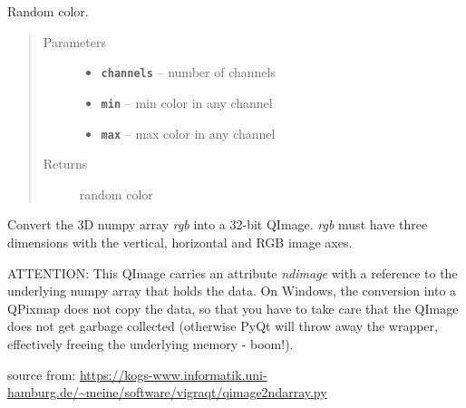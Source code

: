 \documentclass[letterpaper,10pt,english]{sphinxmanual}
\begin{document}

\begin{fulllineitems}
\label{RRtoolbox.lib:RRtoolbox.lib.image.random_color}
Random color.
\begin{quote}\begin{description}
\item[{Parameters}] \leavevmode\begin{itemize}
\item {} 
\textbf{\texttt{channels}} -- number of channels

\item {} 
\textbf{\texttt{min}} -- min color in any channel

\item {} 
\textbf{\texttt{max}} -- max color in any channel

\end{itemize}

\item[{Returns}] \leavevmode
random color

\end{description}\end{quote}

\end{fulllineitems}


\begin{fulllineitems}
\label{RRtoolbox.lib:RRtoolbox.lib.image.rgb2qi}
Convert the 3D numpy array \emph{rgb} into a 32-bit QImage.  \emph{rgb} must
have three dimensions with the vertical, horizontal and RGB image axes.

ATTENTION: This QImage carries an attribute \emph{ndimage} with a
reference to the underlying numpy array that holds the data. On
Windows, the conversion into a QPixmap does not copy the data, so
that you have to take care that the QImage does not get garbage
collected (otherwise PyQt will throw away the wrapper, effectively
freeing the underlying memory - boom!).

source from: \href{https://kogs-www.informatik.uni-hamburg.de/~meine/software/vigraqt/qimage2ndarray.py}{https://kogs-www.informatik.uni-hamburg.de/\textasciitilde{}meine/software/vigraqt/qimage2ndarray.py}

\end{fulllineitems}
\end{document}
